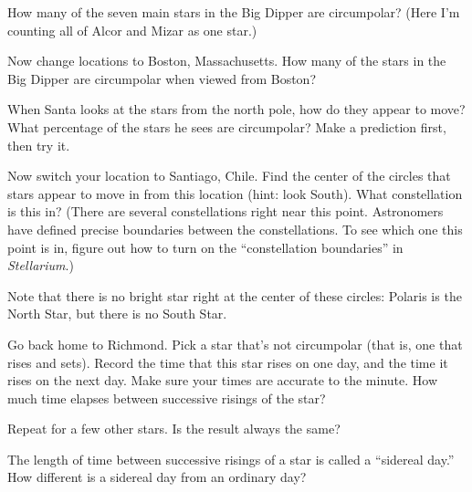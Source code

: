 How many of the seven main stars in the
Big Dipper are circumpolar? (Here I'm counting all of
Alcor and Mizar as one star.)


\vskip 1in

Now change locations to Boston, Massachusetts.  How many of the stars
in the Big Dipper are circumpolar when viewed from Boston?

\vskip 1in

When Santa looks at the stars from the north pole, how do they
appear to move?  What percentage of the stars he sees are circumpolar?
Make a prediction first, then try it.

\vskip 1in

Now switch your location to Santiago, Chile.  Find the center of the
circles that stars appear to move in from this location (hint: look South).
What constellation is this in? (There are several constellations right near
this point. Astronomers have defined precise boundaries between the
constellations. To see which one this point is in, figure out how to turn
on the ``constellation boundaries'' in \textit{Stellarium}.)

\vskip 1in

Note that there is no bright star right at the center of these circles:
Polaris is the North Star, but there is no South Star.

Go back home to Richmond.
Pick a star that's not circumpolar (that is, one that rises and sets).
Record the time that this star rises on one day, and the time it
rises on the next day.  Make sure your times are accurate to the minute.
How much time elapses between successive risings of the star?

\vskip 1in

Repeat for a few other stars.  Is the result always the same?

\vskip 1in


The length of time between successive risings of a star is called a
``sidereal day.''  How different is a sidereal day from  an ordinary
day?

